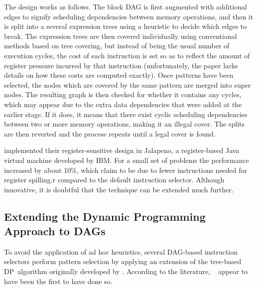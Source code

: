 The design works as follows.
%
The \gls{block DAG} is first augmented with additional \glspl{edge} to signify
scheduling dependencies between memory operations, and then it is split into a
several \glspl{expression tree} using a heuristic to decide which \glspl{edge}
to break.
%
The \glspl{expression tree} are then covered individually using conventional
methods based on \gls{tree covering}, but instead of being the usual number of
execution cycles, the cost of each \gls{instruction} is set so as to reflect the
amount of \gls{register pressure} incurred by that instruction (unfortunately,
the paper lacks details on how these costs are computed exactly).
%
Once \glspl{pattern} have been selected, the \glspl{node} which are covered by
the same \gls{pattern} are merged into \glspl{super node}.
%
The resulting \gls{graph} is then checked for whether it contains any
\glspl{cycle}, which may appear due to the extra data dependencies that were
added at the earlier stage.
%
If it does, it means that there exist cyclic scheduling dependencies between two
or more memory operations, making it an illegal cover.
%
The splits are then reverted and the process repeats until a legal cover is
found.

\citeauthor{SarkarEtAl:2001} implemented their \gls{register}-sensitive design in
\gls{Jalapeno}, a \gls{register}-based \gls{Java} virtual machine developed by
\gls{IBM}.
%
For a small set of problems the performance increased by about 10\%, which
\citeauthor{SarkarEtAl:2001} claim to be due to fewer \glspl{instruction} needed for
\gls{register} \gls{spilling.r} compared to the default \gls{instruction
  selector}.
%
Although innovative, it is doubtful that the technique can be extended much
further.


\subsection{Extending the Dynamic Programming Approach to DAGs}

To avoid the application of ad hoc heuristics, several \gls{DAG}-based
\glspl{instruction selector} perform \gls{pattern selection} by applying an
extension of the \gls{tree}-based \gls{DP}~algorithm originally developed by
\textcite{AhoJohnson:1976}.
%
According to the literature, \citeauthor{LiemEtAl:1994}~\cite{LiemEtAl:1994,
  PaulinEtAl:1994, PaulinEtAl:1995} appear to have been the first to have done so.

